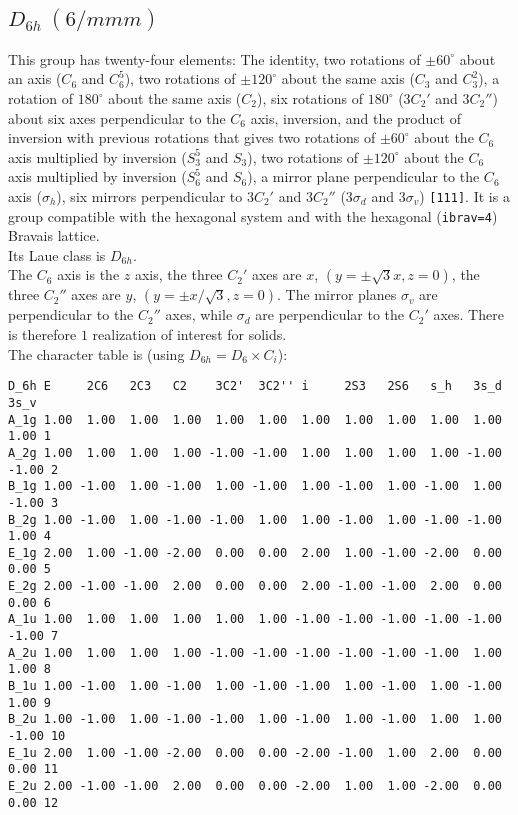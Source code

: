 \documentclass[12pt,a4paper]{article}
\begin{document}
\subsection{\color{web-blue}$D_{6h}\ (6/mmm)$} 
This group has twenty-four elements: The identity, two rotations of 
$\pm60^\circ$ about an axis ($C_6$ and $C_6^5$), two rotations of 
$\pm120^\circ$ about the same axis ($C_3$ and $C_3^2$), a rotation of 
$180^\circ$ about the same axis ($C_2$), six rotations of $180^\circ$ 
($3C_2'$ and $3C_2''$) about six axes perpendicular to the $C_6$ axis,
inversion, and the product of inversion with previous rotations that gives
two rotations of $\pm60^\circ$ about the
$C_6$ axis multiplied by inversion ($S_3^5$ and $S_3$), two rotations of 
$\pm120^\circ$ about the $C_6$ axis multiplied by inversion 
($S_6^5$ and $S_6$), a mirror plane 
perpendicular to the $C_6$ axis ($\sigma_h$), six mirrors perpendicular 
to $3C_2'$ and $3C_2''$ ($3\sigma_d$ and $3\sigma_v$) \texttt{[111]}.
It is a group compatible with the hexagonal system
and with the hexagonal (\texttt{ibrav=4}) Bravais lattice. \\
Its Laue class is $D_{6h}$. \\
The $C_6$ axis is the $z$ axis, the three $C_2'$ axes are 
$x$, $(y=\pm\sqrt{3}x, z=0)$, the three $C_2''$ axes
are $y$, $(y=\pm x/\sqrt{3}, z=0)$. The mirror planes
$\sigma_v$ are perpendicular to the $C_2''$ axes, while $\sigma_d$ are
perpendicular to the $C_2'$ axes. There is therefore $1$ realization
of interest for solids. \\
The character table is (using $D_{6h}=D_6 \times C_i$):
\begin{footnotesize}
\begin{verbatim}
D_6h E     2C6   2C3   C2    3C2'  3C2'' i     2S3   2S6   s_h   3s_d  3s_v 
A_1g 1.00  1.00  1.00  1.00  1.00  1.00  1.00  1.00  1.00  1.00  1.00  1.00 1
A_2g 1.00  1.00  1.00  1.00 -1.00 -1.00  1.00  1.00  1.00  1.00 -1.00 -1.00 2
B_1g 1.00 -1.00  1.00 -1.00  1.00 -1.00  1.00 -1.00  1.00 -1.00  1.00 -1.00 3
B_2g 1.00 -1.00  1.00 -1.00 -1.00  1.00  1.00 -1.00  1.00 -1.00 -1.00  1.00 4
E_1g 2.00  1.00 -1.00 -2.00  0.00  0.00  2.00  1.00 -1.00 -2.00  0.00  0.00 5
E_2g 2.00 -1.00 -1.00  2.00  0.00  0.00  2.00 -1.00 -1.00  2.00  0.00  0.00 6
A_1u 1.00  1.00  1.00  1.00  1.00  1.00 -1.00 -1.00 -1.00 -1.00 -1.00 -1.00 7
A_2u 1.00  1.00  1.00  1.00 -1.00 -1.00 -1.00 -1.00 -1.00 -1.00  1.00  1.00 8
B_1u 1.00 -1.00  1.00 -1.00  1.00 -1.00 -1.00  1.00 -1.00  1.00 -1.00  1.00 9
B_2u 1.00 -1.00  1.00 -1.00 -1.00  1.00 -1.00  1.00 -1.00  1.00  1.00 -1.00 10
E_1u 2.00  1.00 -1.00 -2.00  0.00  0.00 -2.00 -1.00  1.00  2.00  0.00  0.00 11
E_2u 2.00 -1.00 -1.00  2.00  0.00  0.00 -2.00  1.00  1.00 -2.00  0.00  0.00 12
\end{verbatim}
\end{footnotesize}
\end{document}
